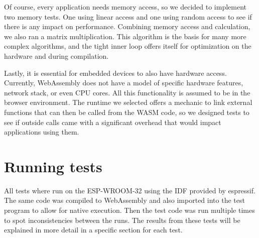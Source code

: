 Of course, every application needs memory access, so we decided to implement two memory tests. One using linear access and one using random access to see if there is any impact on performance. Combining memory access and calculation, we also ran a matrix multiplication. This algorithm is the basis for many more complex algorithms, and the tight inner loop offers itself for optimization on the hardware and during compilation.

Lastly, it is essential for embedded devices to also have hardware access. Currently, WebAssembly does not have a model of specific hardware features, network stack, or even CPU cores. All this functionality is assumed to be in the browser environment. The runtime we selected offers a mechanic to link external functions that can then be called from the WASM code, so we designed tests to see if outside calls came with a significant overhead that would impact applications using them.

\section{Running tests}
All tests where run on the ESP-WROOM-32 using the IDF provided by espressif. The same code was compiled to WebAssembly and also imported into the test program to allow for native execution. Then the test code was run multiple times to spot inconsistencies between the runs. The results from these tests will be explained in more detail in a specific section for each test.

